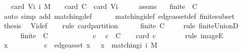 \begin{isabellebody}
\ \ {\isacharequal}\ card\ {\isacharparenleft}V{\isacharunderscore}i\ i\ M{\isacharparenright}{\isachardoublequoteclose}\ {\isacharparenleft}\ {\isachardoublequoteopen}{}\ {\isacharasterisk}\ card\ {\isacharquery}C\ {\isacharequal}\ card\ {\isacharquery}Vi{\isachardoublequoteclose}{\isacharparenright}\isanewline
%
\isadelimproof
%
\endisadelimproof
%
\isatagproof
{}\isamarkupfalse%
\ {\isacharminus}\isanewline
\ \ \isamarkupfalse%
\ assms\ \isamarkupfalse%
\ {}{\isacharcolon}\ {\isachardoublequoteopen}finite\ {\isacharparenleft}{\isasymUnion}\ {\isacharquery}C{\isacharparenright}{\isachardoublequoteclose}\ \isanewline
\ \ \ \ \isamarkupfalse%
\ {\isacharparenleft}auto\ simp\ add{\isacharcolon}\ matching{\isacharunderscore}def\isanewline
\ \ \ \ \ \ matching{\isacharunderscore}i{\isacharunderscore}def\ edge{\isacharunderscore}as{\isacharunderscore}set{\isacharunderscore}def\ finite{\isacharunderscore}subset{\isacharparenright}\isanewline
\ \ \isamarkupfalse%
\ {\isacharquery}thesis\ \isamarkupfalse%
\ V{\isacharunderscore}i{\isacharunderscore}def\isanewline
\ \ \isamarkupfalse%
\ {\isacharparenleft}rule\ card{\isacharunderscore}partition{\isacharparenright}\isanewline
\ \ \ \ \isamarkupfalse%
\ {\isachardoublequoteopen}finite\ {\isacharquery}C{\isachardoublequoteclose}\ \isamarkupfalse%
\ {}\ \isamarkupfalse%
\ {\isacharparenleft}rule\ finite{\isacharunderscore}UnionD{\isacharparenright}\isanewline
\ \ \isamarkupfalse%
\isanewline
\ \ \ \ \isamarkupfalse%
\ {\isachardoublequoteopen}finite\ {\isacharparenleft}{\isasymUnion}\ {\isacharquery}C{\isacharparenright}{\isachardoublequoteclose}\ \isamarkupfalse%
\ {}\ \isacommand{{\isachardot}}\isamarkupfalse%
\isanewline
\ \ \isamarkupfalse%
\isanewline
\ \ \ \ \isamarkupfalse%
\ c\ \isamarkupfalse%
\ {\isachardoublequoteopen}c\ {\isasymin}\ {\isacharquery}C{\isachardoublequoteclose}\ \isamarkupfalse%
\ \isamarkupfalse%
\ {\isachardoublequoteopen}card\ c\ {\isacharequal}\ {}{\isachardoublequoteclose}\isanewline
\ \ \ \ \isamarkupfalse%
\ {\isacharparenleft}rule\ imageE{\isacharparenright}\isanewline
\ \ \ \ \ \ \isamarkupfalse%
\ x\ \isanewline
\ \ \ \ \ \ \isamarkupfalse%
\ {}{\isacharcolon}\ {\isachardoublequoteopen}c\ {\isacharequal}\ edge{\isacharunderscore}as{\isacharunderscore}set\ x{\isachardoublequoteclose}\ \ {}{\isacharcolon}\ {\isachardoublequoteopen}x\ {\isasymin}\ matching{\isacharunderscore}i\ i\ M{\isachardoublequoteclose}\isanewline

\end{isabellebody}
